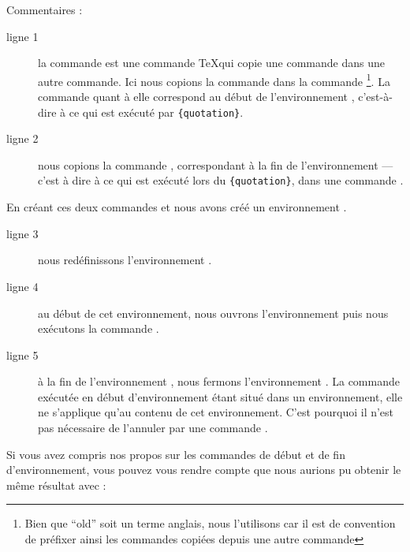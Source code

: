 Commentaires : 

\begin{description}
\item[ligne 1] la commande  est une commande \TeX qui copie une commande dans une autre commande. Ici nous copions la commande  dans la commande \footnote{Bien que \enquote{old} soit un terme anglais, nous l'utilisons car il est de convention de préfixer ainsi les commandes copiées depuis une autre commande}. La commande  quant à elle correspond au début de l'environnement , c'est-à-dire à ce qui est exécuté par \verb|{quotation}|.
\item[ligne 2] nous copions la commande , correspondant à la fin de l'environnement   --- c'est à dire à ce qui est exécuté lors du \verb|{quotation}|, dans une commande .
\end{description}

En créant ces deux commandes  et  nous avons créé un environnement .

\begin{description}
\item[ligne 3]nous redéfinissons l'environnement .
\item[ligne 4]au début de cet environnement, nous ouvrons l'environnement  puis nous exécutons la commande .
\item[ligne 5]à la fin de l'environnement , nous fermons l'environnement . La commande  exécutée en début d'environnement étant situé dans un environnement, elle ne s'applique qu'au contenu de cet environnement. C'est pourquoi il n'est pas nécessaire de l'annuler par une commande . 
\end{description}

\begin{plusloins}
Si vous avez compris nos propos sur les commandes de début et de fin d'environnement, vous pouvez vous rendre compte que nous aurions pu obtenir le même résultat avec :

\begin{latexcode}
\let\endoldquotation\endquotation
\renewcommand{\quotation}{\oldquotation\singlespace}
\end{latexcode}

\end{plusloins}

